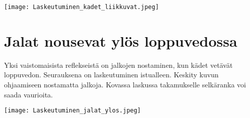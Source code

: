 \begin{Figure}\centering\texttt{[image: Laskeutuminen\_kadet\_liikkuvat.jpeg]}\end{Figure} 

\section{ Jalat nousevat ylös loppuvedossa }
\label{laskeutumisvirheet-jalat-nousevat-ylos-loppuvedossa}


Yksi vaistomaisista reflekseistä on jalkojen nostaminen, kun kädet vetävät loppuvedon. Seurauksena on laskeutuminen istualleen. Keskity kuvun ohjaamiseen nostamatta jalkoja. Kovassa laskussa takamukselle selkäranka voi saada vaurioita. 


\begin{Figure}\centering\texttt{[image: Laskeutuminen\_jalat\_ylos.jpeg]}\end{Figure} 

